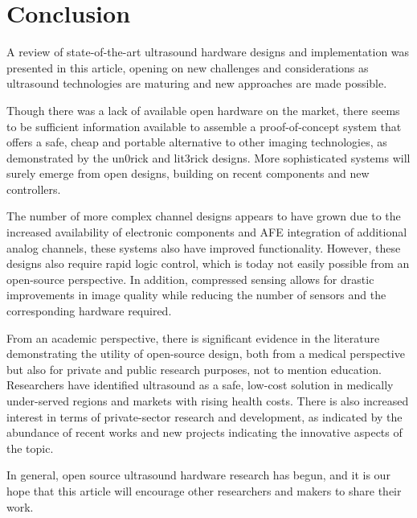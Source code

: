 \documentclass{article}
\begin{document}
\newpage
\section{Conclusion}

A review of state-of-the-art ultrasound hardware designs and implementation was presented in this article, opening on new challenges and considerations as ultrasound technologies are maturing and new approaches are made possible.

Though there was a lack of available open hardware on the market, there seems to be sufficient information available to assemble a proof-of-concept system that offers a safe, cheap and portable alternative to other imaging technologies, as demonstrated by the un0rick and lit3rick designs. More sophisticated systems will surely emerge from open designs, building on recent components and new controllers.

The number of more complex channel designs appears to have grown due to the increased availability of electronic components and AFE integration of additional analog channels, these systems also have improved functionality. However, these designs also require rapid logic control, which is today not easily possible from an open-source perspective. In addition, compressed sensing allows for drastic improvements in image quality while reducing the number of sensors and the corresponding hardware required. 

From an academic perspective, there is significant evidence in the literature demonstrating the utility of open-source design, both from a medical perspective but also for private and public research purposes, not to mention education. Researchers have identified ultrasound as a safe, low-cost solution in medically under-served regions and markets with rising health costs. There is also increased interest in terms of private-sector research and development, as indicated by the abundance of recent works and new projects indicating the innovative aspects of the topic. 



In general, open source ultrasound hardware research \cite{roman_open-source_2019} has begun, and it is our hope that this article will encourage other researchers and makers to share their work. 
\end{document}
